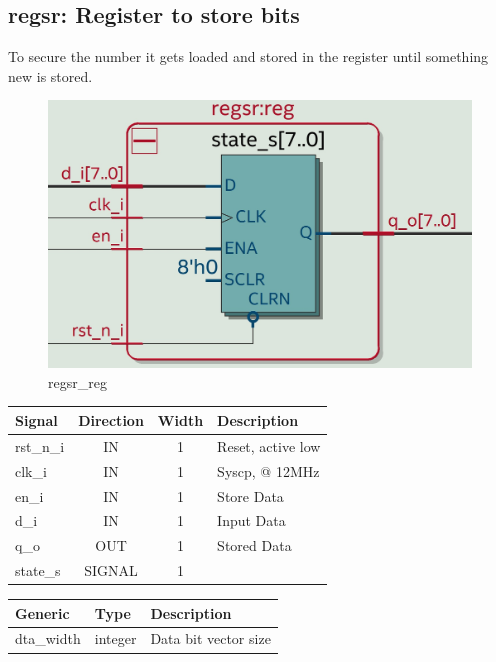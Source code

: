 \documentclass[12pt,a4 paper] {report}
\begin{document}
\subsection{regsr: Register to store bits}
To secure the number it gets loaded and stored in the register until something new is stored.
\begin{figure}[h]
	\centering	
	\includegraphics[scale=0.15]{../png/regsr_reg.png}
	\caption{regsr\_reg}
\end{figure}
\begin{center}
	\begin{tabular}{ | p{2cm} | c | c | p{5cm} |}
		\hline
		\textbf{Signal} & \textbf{Direction} & \textbf{Width} & \textbf{Description} \\
		\hline	
 		rst\_n\_i & IN & 1 & Reset, active low \\
 		\hline
		clk\_i & IN & 1 & Syscp, @ 12MHz \\
		\hline
		en\_i & IN & 1 & Store Data \\
		\hline
		d\_i & IN & 1 & Input Data \\
		\hline
		q\_o & OUT & 1 & Stored Data \\
		\hline
		\hline
		state\_s & SIGNAL & 1 & \\
		\hline
	\end{tabular}
\end{center}
\begin{center}
	\begin{tabular}{| p{2cm} | p{2cm} | p{4cm} |}
	\hline
	\textbf{Generic} & \textbf{Type} & \textbf{Description} \\
	\hline
	dta\_width & integer & Data bit vector size \\
	\hline
	\end{tabular}
\end{center}
\end{document}

